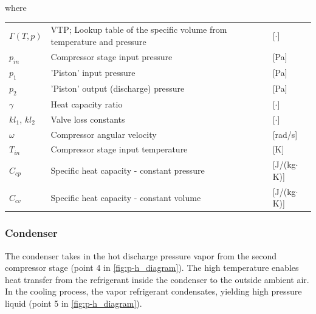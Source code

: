 where

\begin{center}
	\begin{tabular}{l p{8cm} l}
		$\Gamma(T,p)$   & VTP; Lookup table of the specific volume from temperature and pressure & [$\cdot$]                         \\
		$p_{in}$        & Compressor stage input pressure                                        & [\si{Pa}]                         \\
		$p_1$           & 'Piston' input pressure                                                & [\si{Pa}]                         \\
		$p_2$           & 'Piston' output (discharge) pressure                                   & [\si{Pa}]                         \\
		$\gamma$        & Heat capacity ratio                                                    & [$ \cdot $]                       \\
		$ kl_1$, $kl_2$ & Valve loss constants                                                   & [$ \cdot $]                       \\
		$\omega$        & Compressor angular velocity                                            & [\si{rad}/\si{s}]                 \\
		$T_{in}$        & Compressor stage input temperature                                     & [\si{K}]                          \\
		$C_{cp}$        & Specific heat capacity - constant pressure                             & [\si{J}/(\si{kg}$ \cdot $\si{K})] \\
		$C_{cv} $       & Specific heat capacity - constant volume                               & [\si{J}/(\si{kg}$ \cdot $\si{K})]
	\end{tabular}
\end{center}



\newpage

\subsubsection{Condenser}\label{sec:condenser}
The condenser takes in the hot discharge pressure vapor from the second compressor stage (point 4 in \cref{fig:p-h_diagram}). The high temperature enables heat transfer from the refrigerant inside the condenser to the outside ambient air. In the cooling process, the vapor refrigerant condensates, yielding high pressure liquid (point 5 in \cref{fig:p-h_diagram}).

